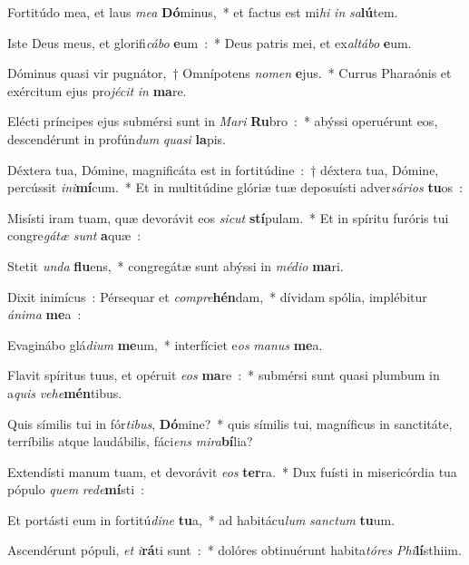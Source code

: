 ﻿\item Fortitúdo mea, et laus \emph{me}\emph{a} \textbf{Dó}minus,~* et factus est mi\emph{hi} \emph{in} \emph{sa}\textbf{lú}tem.
\item Iste Deus meus, et glorifi\emph{cá}\emph{bo} \textbf{e}um~:~* Deus patris mei, et ex\emph{al}\emph{tá}\emph{bo} \textbf{e}um.
\item Dóminus quasi vir pugnátor,~† Omnípotens \emph{no}\emph{men} \textbf{e}jus.~* Currus Pharaónis et exércitum ejus pro\emph{jé}\emph{cit} \emph{in} \textbf{ma}re.
\item Elécti príncipes ejus submérsi sunt in \emph{Ma}\emph{ri} \textbf{Ru}bro~:~* abýssi operuérunt eos, descendérunt in profún\emph{dum} \emph{qua}\emph{si} \textbf{la}pis.
\item Déxtera tua, Dómine, magnificáta est in fortitúdine~:~† déxtera tua, Dómine, percússit \emph{in}\emph{i}\textbf{mí}cum.~* Et in multitúdine glóriæ tuæ deposuísti adver\emph{sá}\emph{ri}\emph{os} \textbf{tu}os~:
\item Misísti iram tuam, quæ devorávit eos \emph{si}\emph{cut} \textbf{stí}pulam.~* Et in spíritu furóris tui congre\emph{gá}\emph{tæ} \emph{sunt} \textbf{a}quæ~:
\item Stetit \emph{un}\emph{da} \textbf{flu}ens,~* congregátæ sunt abýssi in \emph{mé}\emph{di}\emph{o} \textbf{ma}ri.
\item Dixit inimícus~: Pérsequar et \emph{com}\emph{pre}\textbf{hén}dam,~* dívidam spólia, implébitur \emph{á}\emph{ni}\emph{ma} \textbf{me}a~:
\item Evaginábo glá\emph{di}\emph{um} \textbf{me}um,~* interfíciet e\emph{os} \emph{ma}\emph{nus} \textbf{me}a.
\item Flavit spíritus tuus, et opéruit \emph{e}\emph{os} \textbf{ma}re~:~* submérsi sunt quasi plumbum in a\emph{quis} \emph{ve}\emph{he}\textbf{mén}tibus.
\item Quis símilis tui in fór\emph{ti}\emph{bus}, \textbf{Dó}mine?~* quis símilis tui, magníficus in sanctitáte, terríbilis atque laudábilis, fáci\emph{ens} \emph{mi}\emph{ra}\textbf{bí}lia?
\item Extendísti manum tuam, et devorávit \emph{e}\emph{os} \textbf{ter}ra.~* Dux fuísti in misericórdia tua pópulo \emph{quem} \emph{red}\emph{e}\textbf{mí}sti~:
\item Et portásti eum in fortitú\emph{di}\emph{ne} \textbf{tu}a,~* ad habitácu\emph{lum} \emph{san}\emph{ctum} \textbf{tu}um.
\item Ascendérunt pópuli, \emph{et} \emph{i}\textbf{rá}ti sunt~:~* dolóres obtinuérunt habita\emph{tó}\emph{res} \emph{Phi}\textbf{lí}sthiim.\ifx\lalinebreakafterfifteen\undefined\else\\\fi
